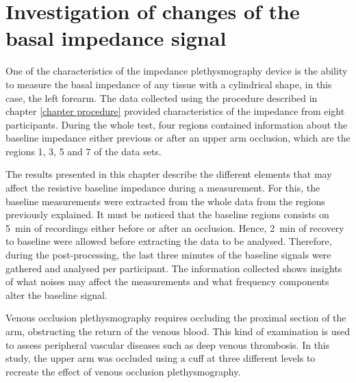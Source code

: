 
\chapter{Investigation of changes of the basal impedance signal}  %
\label{chapter basal}

\ifpdf
\graphicspath{{Chapter6/Figs/Raster/}{Chapter6/Figs/PDF/}{Chapter6/Figs/}}
\else
\graphicspath{{Chapter6/Figs/Vector/}{Chapter6/Figs/}}
\fi

One of the characteristics of the impedance plethysmography device is the ability to measure the basal impedance of any tissue with a cylindrical shape, in this case, the left forearm. The data collected using the procedure described in chapter \ref{chapter procedure} provided characteristics of the impedance from eight participants. During the whole test, four regions contained information about the baseline impedance either previous or after an upper arm occlusion, which are the regions 1, 3, 5 and 7 of the data sets. 

The results presented in this chapter describe the different elements that may affect the resistive baseline impedance during a measurement. For this, the baseline measurements were extracted from the whole data from the regions previously explained. It must be noticed that the baseline regions consists on \SI{5}{\minute} of recordings either before or after an occlusion. Hence, \SI{2}{\minute} of recovery to baseline were allowed before extracting the data to be analysed. Therefore, during the post-processing, the last three minutes of the baseline signals were gathered and analysed per participant. The information collected shows insights of what noises may affect the measurements and what frequency components alter the baseline signal. 


Venous occlusion plethysmography requires occluding the proximal section of the arm, obstructing the return of the venous blood. This kind of examination is used to assess peripheral vascular diseases such as deep venous thrombosis.  In this study, the upper arm was occluded using a cuff at three different levels to recreate the effect of venous occlusion plethysmography.

